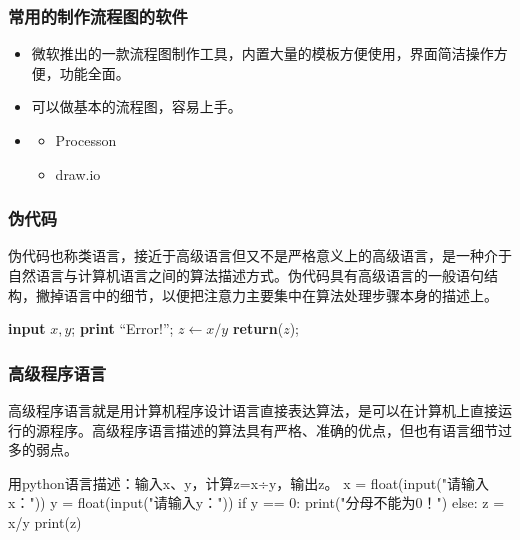 \begin{frame}
    \frametitle{常用的制作流程图的软件}
    \begin{itemize}
      \item {}
      
      微软推出的一款流程图制作工具，内置大量的模板方便使用，界面简洁操作方便，功能全面。
      
      \item {}
      
      可以做基本的流程图，容易上手。
      
      \item {}
        \begin{itemize}
          \item Processon 
          \item draw.io 
        \end{itemize}
    \end{itemize}
\end{frame}

\begin{frame}
    \frametitle{伪代码}
    伪代码也称类语言，接近于高级语言但又不是严格意义上的高级语言，是一种介于自然语言与计算机语言之间的算法描述方式。伪代码具有高级语言的一般语句结构，撇掉语言中的细节，以便把注意力主要集中在算法处理步骤本身的描述上。
    \vspace{-4pt}
      \begin{algorithm}[H]  
        \caption{Calculate $y = x/y$}
      \begin{algorithmic}[1]
        \Begin
        \State \textbf{input} $x,y$;
        \State \textbf{print} “Error!”;
        \Else
        \State $z \gets x/y$
        \State \textbf{return}($z$);
        \End
        \end{algorithmic}
        \end{algorithm}
\end{frame}

\begin{frame}[fragile]
    \frametitle{高级程序语言}
    高级程序语言就是用计算机程序设计语言直接表达算法，是可以在计算机上直接运行的源程序。高级程序语言描述的算法具有严格、准确的优点，但也有语言细节过多的弱点。

\begin{codeblock}{用python语言描述：输入x、y，计算z=x÷y，输出z。}
  x = float(input("请输入x："))
  y = float(input("请输入y："))
  if y == 0:
      print("分母不能为0！")
  else:
      z = x/y
      print(z)
\end{codeblock}
\end{frame}



